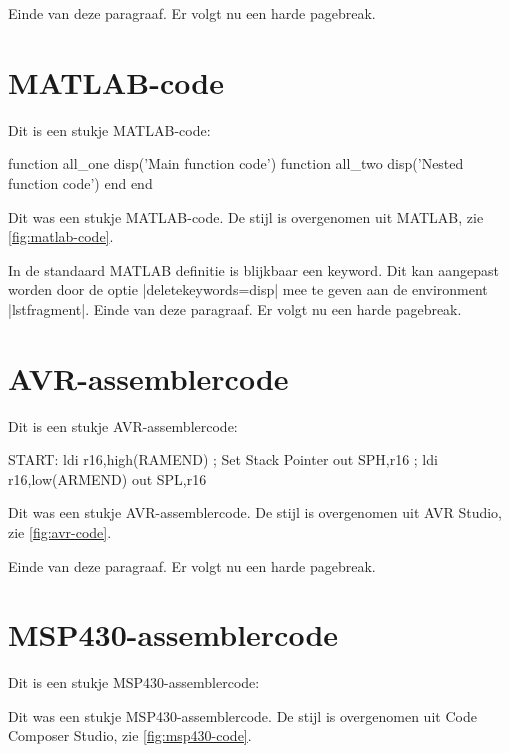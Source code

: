 \begin{llstShortInline}
Einde van deze paragraaf. 
Er volgt nu een harde pagebreak.

\clearpage
\section{MATLAB-code}
Dit is een stukje MATLAB-code:
\begin{lstfragment}[style=mstyle,deletekeywords={disp}]
function all_one
	disp('Main function code')
	function all_two
		disp('Nested function code')
	end
end
\end{lstfragment}
Dit was een stukje MATLAB-code. 
De stijl is overgenomen uit MATLAB, zie \cref{fig:matlab-code}.


In de standaard MATLAB definitie is  blijkbaar een keyword. 
Dit kan aangepast worden door de optie |deletekeywords={disp}| mee te geven aan de environment |lstfragment|.
Einde van deze paragraaf. 
Er volgt nu een harde pagebreak.

\clearpage
\section{AVR-assemblercode}
Dit is een stukje AVR-assemblercode:
\begin{lstfragment}[style=astyle]
START:
	ldi	r16,high(RAMEND)	;	Set Stack Pointer
	out	SPH,r16				;
	ldi	r16,low(ARMEND)
	out	SPL,r16
\end{lstfragment}
Dit was een stukje AVR-assemblercode. 
De stijl is overgenomen uit AVR Studio, zie \cref{fig:avr-code}.


Einde van deze paragraaf. 
Er volgt nu een harde pagebreak.

\clearpage
\section{MSP430-assemblercode}
Dit is een stukje MSP430-assemblercode:
Dit was een stukje MSP430-assemblercode. 
De stijl is overgenomen uit Code Composer Studio, zie \cref{fig:msp430-code}.


\end{llstShortInline}
